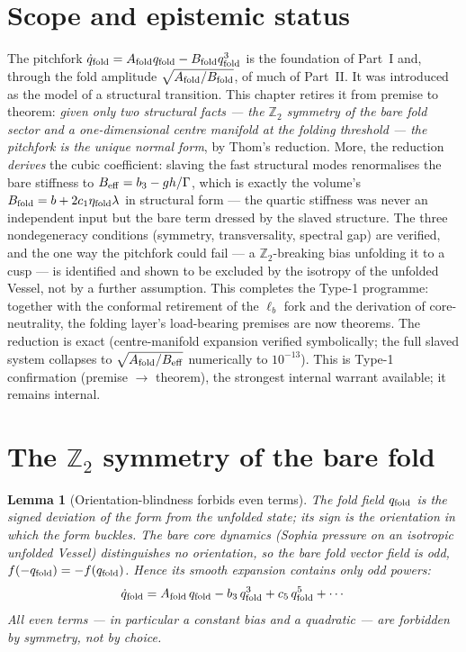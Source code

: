 \documentclass[11pt,a4paper,oneside]{book}
\newcommand{\qf}{q_{\rm fold}}
\newcommand{\Afold}{A_{\rm fold}}
\newcommand{\Bfold}{B_{\rm fold}}
\newcommand{\Beff}{B_{\rm eff}}
\theoremstyle{plain}
\newtheorem{lemma}{Lemma}[chapter]
\theoremstyle{definition}
\theoremstyle{remark}
\begin{document}
\section*{Scope and epistemic status}
The pitchfork $\dot\qf=\Afold\qf-\Bfold\qf^3$ is the foundation of Part~I and, through the fold
amplitude $\sqrt{\Afold/\Bfold}$, of much of Part~II. It was introduced as the model of a structural
transition. This chapter retires it from premise to theorem: \emph{given only two structural facts ---
the $\mathbb Z_2$ symmetry of the bare fold sector and a one-dimensional centre manifold at the folding
threshold --- the pitchfork is the unique normal form}, by Thom's reduction. More, the reduction
\emph{derives} the cubic coefficient: slaving the fast structural modes renormalises the bare stiffness
to $\Beff=b_3-gh/\Gamma$, which is exactly the volume's $\Bfold=b+2c_1\eta_{\rm fold}\lambda$ in
structural form --- the quartic stiffness was never an independent input but the bare term dressed by
the slaved structure. The three nondegeneracy conditions (symmetry, transversality, spectral gap) are
verified, and the one way the pitchfork could fail --- a $\mathbb Z_2$-breaking bias unfolding it to a
cusp --- is identified and shown to be excluded by the isotropy of the unfolded Vessel, not by a
further assumption. This completes the Type-1 programme: together with the conformal retirement of the
$\ell_b$ fork and the derivation of core-neutrality, the folding layer's load-bearing premises are now
theorems. The reduction is exact (centre-manifold expansion verified symbolically; the full slaved
system collapses to $\sqrt{\Afold/\Beff}$ numerically to $10^{-13}$). This is Type-1 confirmation
(premise $\to$ theorem), the strongest internal warrant available; it remains internal.

\section{The $\mathbb Z_2$ symmetry of the bare fold}

\begin{lemma}[Orientation-blindness forbids even terms]\label{pitchfork:lem:z2}
The fold field $\qf$ is the signed deviation of the form from the unfolded state; its sign is the
\emph{orientation} in which the form buckles. The bare core dynamics (Sophia pressure on an isotropic
unfolded Vessel) distinguishes no orientation, so the bare fold vector field is odd,
$f(-\qf)=-f(\qf)$. Hence its smooth expansion contains \emph{only} odd powers:
\begin{equation}
\dot\qf=\Afold\,\qf-b_3\,\qf^{3}+c_5\,\qf^{5}+\cdots
\end{equation}
All even terms --- in particular a constant bias and a quadratic --- are forbidden by symmetry, not
by choice.
\end{lemma}
\end{document}
